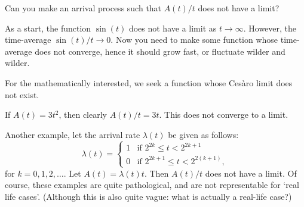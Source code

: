 \documentclass[stochastic-or.tex]{subfiles}
\begin{document}
\begin{extra}
  Can you make an arrival process such that $A(t)/t$ does not have a limit?
\begin{hint}
  As a start, the function $\sin(t)$ does not have a limit as $t\to\infty$.
  However, the time-average $\sin(t)/t \to 0$.
  Now you need to make some function whose time-average does not converge, hence it should grow fast, or fluctuate wilder and wilder.

 For the mathematically interested, we seek a function whose Ces\`aro limit does not exist.
\end{hint}
\begin{solution}
 If $A(t) = 3 t^2$, then clearly $A(t)/t = 3t$. This does not
 converge to a limit.

 Another example, let the arrival rate $\lambda(t)$ be given as follows:
 \begin{equation*}
 \lambda(t) =
 \begin{cases}
 1 & \text{if } 2^{2k} \leq t < 2^{2k+1} \\
 0 & \text{if } 2^{2k+1} \leq t < 2^{2(k+1)},
 \end{cases}
 \end{equation*}
 for $k=0,1,2,\ldots$.
 Let $A(t) = \lambda(t) t$.
 Then $A(t)/t$ does not have a limit.
 Of course, these examples are quite pathological, and are not representable for `real life cases'.
 (Although this is also quite vague:  what is actually a real-life case?)
\end{solution}
\end{extra}


\end{document}
